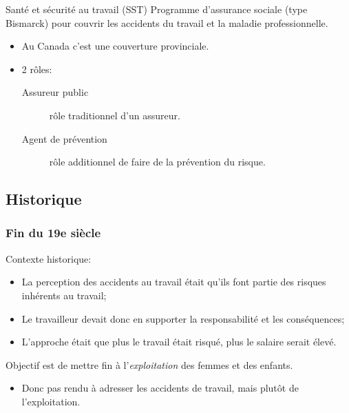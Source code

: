 \documentclass[10pt, french]{article}
\begin{document}
\begin{multicols*}{3}
\begin{conceptgen}{Santé et sécurité au travail (SST)}
Programme d'assurance sociale (type Bismarck) pour couvrir les accidents du travail et la maladie professionnelle. 
\begin{itemize}[leftmargin = *]
	\item	Au Canada c'est une couverture provinciale.
	\item	2 rôles:
		\begin{description}
		\item[Assureur public]	rôle traditionnel d'un assureur.
		\item[Agent de prévention]	rôle additionnel de faire de la prévention du risque.
		\end{description}
\end{itemize}
\end{conceptgen}

\subsection*{Historique}
\subsubsection*{Fin du 19e siècle}

Contexte historique:
\begin{itemize}[leftmargin = *]
	\item	La perception des accidents au travail était qu'ils font partie des risques inhérents au travail;
	\item	Le travailleur devait donc en supporter la responsabilité et les conséquences;
	\item	L'approche était que plus le travail était risqué, plus le salaire serait élevé.
\end{itemize}

\begin{rappel_enhanced}
Objectif est de mettre fin à l'\textit{exploitation} des femmes et des enfants.

\begin{itemize}[leftmargin = *]
\item	Donc pas rendu à adresser les accidents de travail, mais plutôt de l'exploitation.
\end{itemize}
\end{rappel_enhanced}


\end{multicols*}
\end{document}
